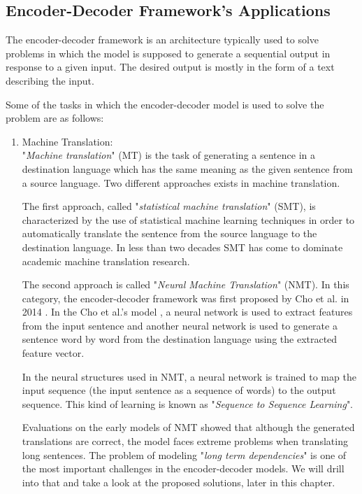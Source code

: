 \documentclass[preprint, 12pt]{elsarticle}
\begin{document}
			\subsection{Encoder-Decoder Framework's Applications}
	The encoder-decoder framework is an architecture typically used to solve problems in which the model is supposed to generate a sequential output in response to a given input. The desired output is mostly in the form of a text describing the input.
	
	Some of the tasks in which the encoder-decoder model is used to solve the problem are as follows:
	\begin{enumerate}
		\item Machine Translation:\\
		"\textit{Machine translation}" (MT) is the task of generating a sentence in a destination language which has the same meaning as the given sentence from a source language. Two different approaches exists in machine translation. 
		
		The first approach, called "\textit{statistical machine translation}" (SMT), is characterized by the use of statistical machine learning techniques in order to automatically translate the sentence from the source language to the destination language. In less than two decades SMT has come to dominate academic machine translation research\cite{lopez2008statistical}. 
		
		The second approach is called "\textit{Neural Machine Translation}" (NMT). In this category, the encoder-decoder framework was first proposed by Cho et al. in 2014 \cite{cho2014learning}. In the Cho et al.'s model \cite{cho2014learning}, a neural network is used to extract features from the input sentence and another neural network is used to generate a sentence word by word from the destination language using the extracted feature vector. 
		
		In the neural structures used in NMT, a neural network is trained to map the input sequence (the input sentence as a sequence of words) to the output sequence. This kind of learning is known as "\textit{Sequence to Sequence Learning}".
		
		Evaluations on the early models of NMT showed that although the generated translations are correct, the model faces extreme problems when translating long sentences\cite{cho2014properties}. The problem of modeling "\textit{long term dependencies}" is one of the most important challenges in the encoder-decoder models. We will drill into that and take a look at the proposed solutions, later in this chapter.
		

\end{enumerate}
\end{document}
